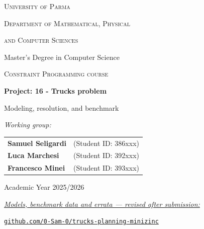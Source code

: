 \documentclass[a4paper,12pt]{article}
\begin{document}
\begin{titlepage}
    \centering

    {\scshape\LARGE University of Parma \par}
    \vspace{0.5cm}
    {\scshape\Large Department of Mathematical, Physical \par}
    {\scshape\Large and Computer Sciences \par}
    \vspace{0.5cm}
    {\large Master's Degree in Computer Science \par}
    \vspace{1.5cm}

    {\scshape\Large Constraint Programming course \par}
    \vspace{2cm}

    {\huge\bfseries Project: 16 - Trucks problem \par}
    \vspace{0.5cm}
    {\Large Modeling, resolution, and benchmark \par}
    \vspace{2cm}

    \large
    \emph{Working group:}\\
    \vspace{0.5cm}

    \begin{tabular}{l l}
        \textbf{Samuel Seligardi} & (Student ID: 386xxx) \\
        \textbf{Luca Marchesi}    & (Student ID: 392xxx) \\
        \textbf{Francesco Minei}  & (Student ID: 393xxx) \\
    \end{tabular}

    \vfill

    {\large Academic Year 2025/2026 \par}

    \vspace{0.8cm}
    {\hypersetup{urlcolor=black}%
     \href{https://github.com/0-Sam-0/trucks-planning-minizinc}%
          {\small\emph{Models, benchmark data and errata --- revised after submission:}}\par
     \vspace{0.15cm}
     \href{https://github.com/0-Sam-0/trucks-planning-minizinc}%
          {\small\texttt{github.com/0-Sam-0/trucks-planning-minizinc}}\par}

\end{titlepage}
\end{document}
